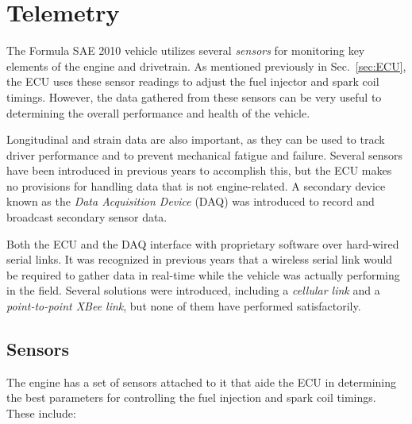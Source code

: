 \section{Telemetry}

The Formula SAE 2010 vehicle utilizes several \emph{sensors} for monitoring key elements of the engine and drivetrain. As mentioned previously in Sec.\ \ref{sec:ECU}, the ECU uses these sensor readings to adjust the fuel injector and spark coil timings. However, the data gathered from these sensors can be very useful to determining the overall performance and health of the vehicle. 

Longitudinal and strain data are also important, as they can be used to track driver performance and to prevent mechanical fatigue and failure. Several sensors have been introduced in previous years to accomplish this, but the ECU makes no provisions for handling data that is not engine-related. A secondary device known as the \emph{Data Acquisition Device} (DAQ)  was introduced to record and broadcast secondary sensor data.

Both the ECU and the DAQ interface with proprietary software over hard-wired serial links. It was recognized in previous years that a wireless serial link would be required to gather data in real-time while the vehicle was actually performing in the field. Several solutions were introduced, including a \emph{cellular link} and a \emph{point-to-point XBee link}, but none of them have performed satisfactorily.

\subsection{Sensors}

The engine has a set of sensors attached to it that aide the ECU in determining the best parameters for controlling the fuel injection and spark coil timings. These include:

